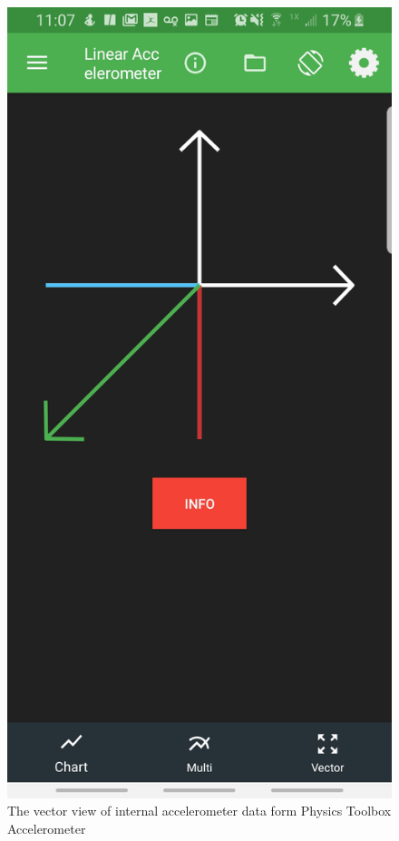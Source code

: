 \documentclass{article}
\begin{document}
\begin{figure}[H]
\centering
\includegraphics[scale= .07]{physicsToolBoxVector}
\caption{The vector view of internal accelerometer data form Physics Toolbox Accelerometer}
\label{fig:phyToolboxVecotor} 
\end{figure}
\end{document}
